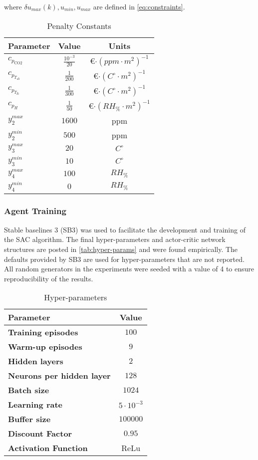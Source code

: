 where $\delta u_{max}(k),u_{min}, u_{max}$ are defined in \autoref{eq:constraints}. 


\begin{table}[h]
	\centering
	\begin{tabular}{|>{\bfseries}l|c|c|}
		\hline
		\textbf{Parameter} & \textbf{Value} & \textbf{Units} \\
		\hline
		$c_{p_{\text{CO2}}}$ & $\frac{10^{-3}}{20}$ & \euro$\cdot (ppm \cdot m^2)^{-1}$ \\
		$c_{p_{T_{ub}}}$ & $\frac{1}{200}$ & \euro$\cdot (C^{\circ} \cdot m^2)^{-1}$ \\
		$c_{p_{T_{lb}}}$ & $\frac{1}{300}$ & \euro$\cdot (C^{\circ} \cdot m^2)^{-1}$ \\
		$c_{p_{H}}$ & $\frac{1}{50}$ & \euro$\cdot (RH_{\%} \cdot m^2)^{-1}$ \\
		$y_2^{max}$ & $1600$ & ppm \\
		$y_2^{min}$ & $500$ & ppm \\
		$y_3^{max}$ & $20$ & $C^{\circ}$ \\
		$y_3^{min}$ & $10$ & $C^{\circ}$ \\
		$y_4^{max}$ & $100$ & $RH_{\%}$ \\
		$y_4^{min}$ & $0$ & $RH_{\%}$ \\       
		\hline
	\end{tabular}
	\caption{Penalty Constants}
	\label{tab:pen-constants}
\end{table}

\subsubsection{Agent Training}
Stable baselines 3 (SB3) \cite{raffinStableBaselines3ReliableReinforcement2021} was used to facilitate the development and training of the SAC algorithm. The final hyper-parameters and actor-critic network structures are posted in \autoref{tab:hyper-params} and were found empirically. The defaults provided by SB3 are used for hyper-parameters that are not reported. All random generators in the experiments were seeded with a value of 4 to ensure reproducibility of the results.

\begin{table}[H]
	\centering
	\begin{tabular}{|>{\bfseries}l|c|}
		\hline
		\textbf{Parameter} & \textbf{Value} \\
		\hline
		Training episodes & $100$  \\
		Warm-up episodes &  $9$ \\
		Hidden layers & $2$ \\
		Neurons per hidden layer & $128$ \\
		Batch size & $1024$ \\
		Learning rate & $5 \cdot 10^{-3}$ \\
		Buffer size & $100000$ \\
		Discount Factor & $0.95$ \\
		Activation Function & ReLu \\
		\hline
	\end{tabular}
	\caption{Hyper-parameters}
	\label{tab:hyper-params}
\end{table}

